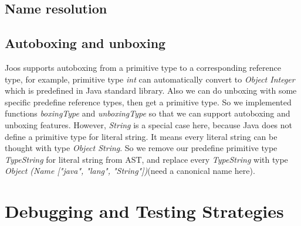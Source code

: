 \documentclass[12pt,letterpaper]{article}
\begin{document}
\subsection{Name resolution}

\subsection{Autoboxing and unboxing}

Joos supports autoboxing from a primitive type to a corresponding reference type, for example, primitive type \emph{int} can automatically convert to \emph{Object Integer} which is predefined in Java standard library.
Also we can do unboxing with some specific predefine reference types, then get a primitive type.
So we implemented functions \emph{boxingType} and \emph{unboxingType} so that we can support autoboxing and unboxing features.
However, \emph{String} is a special case here, because Java does not define a primitive type for literal string.
It means every literal string can be thought with type \emph{Object String}.
So we remove our predefine primitive type \emph{TypeString} for literal string from AST, and replace every \emph{TypeString} with type \emph{Object (Name ["java", "lang", "String"])}(need a canonical name here).

\section{Debugging and Testing Strategies}
\end{document}
